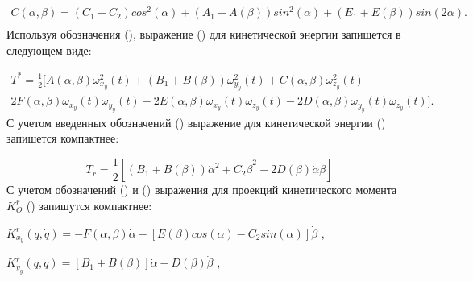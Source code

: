 \begin{equation}
\begin{multlined}
 C \left(  \alpha , \beta  \right) = \left( C_{1}+C_{2} \right) cos^{2} \left(  \alpha  \right) + \left( A_{1}+A \left(  \beta  \right)  \right) sin^{2} \left(  \alpha  \right) + \left( E_{1}+E \left(  \beta  \right)  \right) sin \left( 2 \alpha  \right)   . \nonumber \\
\end{multlined}
\end{equation}
Используя обозначения (), выражение () для кинетической энергии запишется в следующем виде:\par


\begin{equation} %
\label{eq:p3:25}
\begin{multlined}
T^{\ast}=
\frac{1}{2} 
[ 
	A (  \alpha , \beta  )  \omega_{x_{y}}^{2} ( t ) + 
	( B_{1}+B (  \beta  )  )  \omega_{y_{y}}^{2} ( t ) +
	C (  \alpha , \beta  )  \omega_{z_{y}}^{2} ( t ) - \\
	2F (  \alpha , \beta  )  \omega_{x_{y}} ( t )  \omega_{y_{y}} ( t ) -
	2E (  \alpha , \beta  )  \omega_{x_{y}} ( t )  \omega_{z_{y}} ( t ) -
	2D (  \alpha , \beta  )  \omega_{y_{y}} ( t )  \omega_{z_{y}} ( t )  
] .
\end{multlined}
\end{equation}
С учетом введенных обозначений () выражение для кинетической энергии () запишется компактнее:\par


\begin{equation} %
\label{eq:p3:26}
T_{r}=
\frac{1}{2} 
[ 
	( B_{1}+B ( \beta )  )  \dot{\alpha}^{2}+
	C_{2} \dot{\beta}^{2} -  
	2D \left(  \beta  \right)  \dot{\alpha}  \dot{\beta}  
]
\end{equation}
С учетом обозначений () и () выражения для проекций кинетического момента  \( K_{O}^{r} \)  () запишутся компактнее:\par

\( 
K_{x_{y}}^{r} ( q,\dot{q} ) =
-F (  \alpha , \beta  )  \dot{\alpha} - 
[ 
	E (  \beta  ) cos (  \alpha  ) - 
	C_{2}sin (  \alpha  )  
]  \dot{\beta}  
\) ,\par

\( 
K_{y_{y}}^{r} ( q,\dot{q} ) = 
[ B_{1}+B \left(  \beta  \right)  ] \dot{\alpha} -
D (  \beta  )  \dot{\beta}  
\) ,\par

